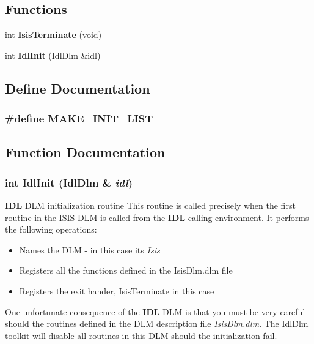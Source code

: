 \subsection*{Functions}
\begin{CompactItemize}
\item 
int {\bf Isis\-Terminate} (void)
\item 
int {\bf Idl\-Init} (Idl\-Dlm \&idl)
\end{CompactItemize}


\subsection{Define Documentation}
\subsubsection{\setlength{\rightskip}{0pt plus 5cm}\#define MAKE\_\-INIT\_\-LIST}\label{IsisDlm_8cpp_a0}




\subsection{Function Documentation}
\subsubsection{\setlength{\rightskip}{0pt plus 5cm}int Idl\-Init (Idl\-Dlm \& {\em idl})}\label{IsisDlm_8cpp_a2}


{\bf IDL} DLM initialization routine This routine is called precisely when the first routine in the ISIS DLM is called from the {\bf IDL} calling environment. It performs the following operations:\begin{itemize}
\item Names the DLM - in this case its {\em Isis\/}\item Registers all the functions defined in the Isis\-Dlm.dlm file\item Registers the exit hander, Isis\-Terminate in this case\end{itemize}
One unfortunate consequence of the {\bf IDL} DLM is that you must be very careful should the routines defined in the DLM description file {\em Isis\-Dlm.dlm\/}. The Idl\-Dlm toolkit will disable all routines in this DLM should the initialization fail.

